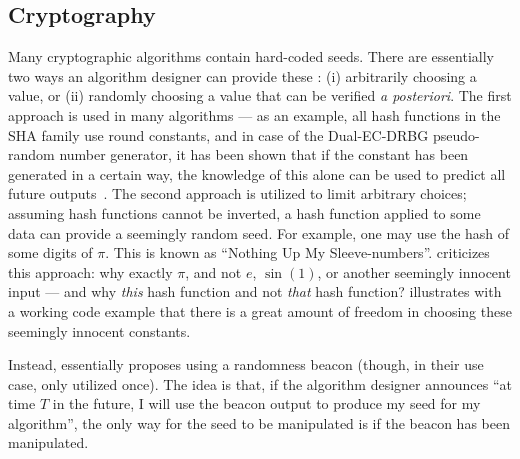 \subsection{Cryptography}\label{subsec:usecase_cryptography}
Many cryptographic algorithms contain hard-coded seeds. There are essentially two ways an algorithm designer can provide these \cite{baigneres2015trap}: (i) arbitrarily choosing a value, or (ii) randomly choosing a value that can be verified \emph{a posteriori}.
The first approach is used in many algorithms --- as an example, all hash functions in the SHA family use round constants, and in case of the Dual-EC-DRBG pseudo-random number generator, it has been shown that if the constant has been generated in a certain way, the knowledge of this alone can be used to predict all future outputs~\cite{dualec-paper}.
The second approach is utilized to limit arbitrary choices; assuming hash functions cannot be inverted, a hash function applied to some data can provide a seemingly random seed. For example, one may use the hash of some digits of $\pi$. This is known as \enquote{Nothing Up My Sleeve-numbers}. \citet{bernstein2015manipulate} criticizes this approach: why exactly $\pi$, and not $e$, $\sin(1)$, or another seemingly innocent input --- and why \emph{this} hash function and not \emph{that} hash function?
\citet{backdoorsupmysleeve} illustrates with a working code example that there is a great amount of freedom in choosing these seemingly innocent constants.

Instead, \citet{baigneres2015trap} essentially proposes using a randomness beacon (though, in their use case, only utilized once). The idea is that, if the algorithm designer announces \enquote{at time $T$ in the future, I will use the beacon output to produce my seed for my algorithm}, the only way for the seed to be manipulated is if the beacon has been manipulated.
